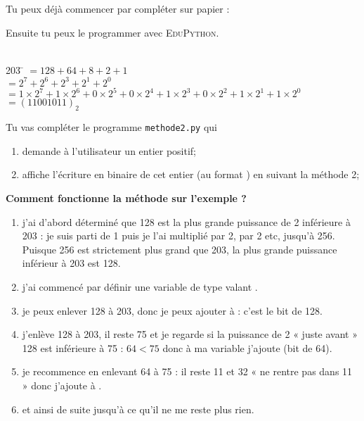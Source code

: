 \documentclass[a4paper,12pt,french]{book}
\begin{document}
Tu peux déjà commencer par compléter sur papier :
\newpage
{}

Ensuite tu peux le programmer avec \textsc{EduPython}.\\

\exo{}\\
\begin{methode}
\begin{tabbing}
	203	\= 	$=128+64+8+2+1$	\\
	
		\>	$=2^7+2^6+2^3+2^1+2^0$	\\
		
		\>	$=1\times 2^7+1\times 2^6+0\times 2^5 + 0\times 2^4 +1\times 2^3+0\times 2^2 + 1\times 
		2^1+1\times 2^0$	\\
		
		\> $=(11001011)_2$
\end{tabbing}
\end{methode}

Tu vas compléter le programme \texttt{methode2.py} qui
\begin{enumerate}[--]
	\item 	demande à l'utilisateur un entier positif;
	\item 	affiche l'écriture en binaire de cet entier (au format ) en suivant la méthode 2;\\
\end{enumerate}

\textbf{Comment fonctionne la méthode sur l'exemple ?}\\

\begin{enumerate}[--]
	\item 	j'ai d'abord déterminé que 128 est la plus grande puissance de 2 inférieure à 203 : je suis parti de 1 puis je l'ai multiplié par 2, par 2 etc, jusqu'à 256. Puisque 256 est strictement plus grand que 203, la plus grande puissance inférieur à 203 est 128.  
	\item 	j'ai commencé par définir une variable  de type  valant .
    \item   je peux enlever 128 à 203, donc je peux ajouter  à  : c'est le bit de 128.
    \item   j'enlève 128 à 203, il reste 75 et je regarde si la puissance de 2 « juste avant » 128 est inférieure à 75 : $64<75$ donc à ma variable  j'ajoute  (bit de 64).
    \item   je recommence en enlevant 64 à 75 : il reste 11 et 32 « ne rentre pas dans 11 » donc j'ajoute  à .
    \item et ainsi de suite jusqu'à ce qu'il ne me reste plus rien.
    
\end{enumerate}
\end{document}
